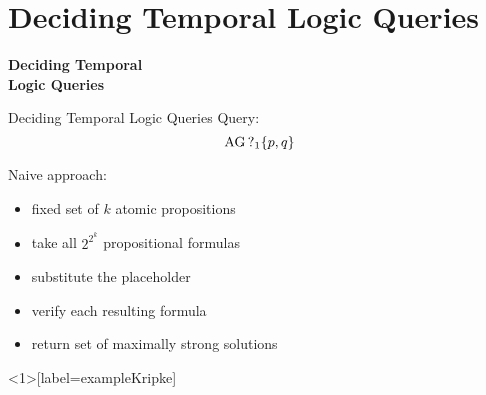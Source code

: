 \section{Deciding Temporal Logic Queries}

\begin{frame}[plain]
  \vfill

  \begin{center}
    \Huge \color{oceangreen} \bfseries 
    Deciding Temporal\\ Logic Queries
  \end{center}

  \vfill
\end{frame}

\begin{frame}{Deciding Temporal Logic Queries}
  Query:
  \[ \operatorname{AG} \operatorname{?}_1 \{p,q\} \]
  
  Naive approach:
  \begin{itemize}
    \item fixed set of $k$ atomic propositions
    \item take all $2^{2^k}$ propositional formulas
    \item substitute the placeholder
    \item verify each resulting formula
    \item return set of maximally strong solutions
  \end{itemize}
\end{frame}


\begin{frame}<1>[label=exampleKripke]
  \vfill

  \begin{center}
  \end{center}

  \vfill
\end{frame}

